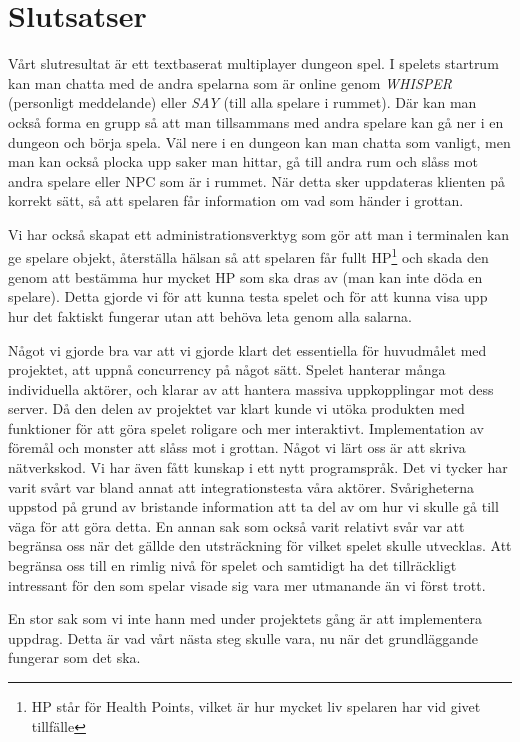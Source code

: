 \documentclass[a4paper]{article}
\begin{document}
\section{Slutsatser}
Vårt slutresultat är ett textbaserat multiplayer dungeon spel. I spelets startrum kan man chatta med de andra spelarna som är online genom \textit{WHISPER} (personligt meddelande) eller \textit{SAY} (till alla spelare i rummet). Där kan man också forma en grupp så att man tillsammans med andra spelare kan gå ner i en dungeon och börja spela. Väl nere i en dungeon kan man chatta som vanligt, men man kan också plocka upp saker man hittar, gå till andra rum och slåss mot andra spelare eller NPC som är i rummet. När detta sker uppdateras klienten på korrekt sätt, så att spelaren får information om vad som händer i grottan.

Vi har också skapat ett administrationsverktyg som gör att man i terminalen kan ge spelare objekt, återställa hälsan så att spelaren får fullt HP\footnote{HP står för Health Points, vilket är hur mycket liv spelaren har vid givet tillfälle} och skada den genom att bestämma hur mycket HP som ska dras av (man kan inte döda en spelare). Detta gjorde vi för att kunna testa spelet och för att kunna visa upp hur det faktiskt fungerar utan att behöva leta genom alla salarna.     

Något vi gjorde bra var att vi gjorde klart det essentiella för huvudmålet med projektet, att uppnå concurrency på något sätt. Spelet hanterar många individuella aktörer, och klarar av att hantera massiva uppkopplingar mot dess server. 
Då den delen av projektet var klart kunde vi utöka produkten med funktioner för att göra spelet roligare och mer interaktivt. 
Implementation av föremål och monster att slåss mot i grottan. 
Något vi lärt oss är att skriva nätverkskod. Vi har även fått kunskap i ett nytt programspråk.
Det vi tycker har varit svårt var bland annat att integrationstesta våra aktörer. Svårigheterna uppstod på grund av bristande 
information att ta del av om hur vi skulle gå till väga för att göra detta. En annan sak som också varit relativt svår var att 
begränsa oss när det gällde den utsträckning för vilket spelet skulle utvecklas. Att begränsa oss till en rimlig nivå för spelet 
och samtidigt ha det tillräckligt intressant för den som spelar visade sig vara mer utmanande än vi först trott.

En stor sak som vi inte hann med under projektets gång är att implementera uppdrag. Detta är vad vårt nästa steg skulle vara, nu när det grundläggande fungerar som det ska.
\end{document}
